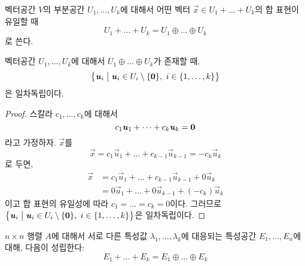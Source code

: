 \documentclass[sections/engineering_mathematics_lecture_note.tex]{subfiles}
\begin{document}
\begin{definition}
    벡터공간 $V$의 부분공간 $U_1, \dots, U_k$에 대해서 어떤 벡터 $\vec x \in U_1 + \dots + U_k$의 합 표현이 유일할 때
    \begin{equation*}
        U_1 + \dots + U_k = U_1 \oplus \dots \oplus U_k
    \end{equation*}
    로 쓴다.
\end{definition}

\begin{theorem} \label{thm:linear_independence_directsum}
    벡터공간 $U_1, \dots, U_k$에 대해서 $U_1 \oplus \dots \oplus U_k$가 존재할 때,
    \begin{equation*}
        \bigl\{\bm{\mathit{u}}_i \bigm| \bm{\mathit{u}}_i \in U_i \setminus \{\bm{\mathrm{0}}\},\ i \in \{1, \dots, k\}\bigr\}
    \end{equation*}
    은 일차독립이다.
\end{theorem}

\begin{proof}
    스칼라 $c_1, \dots, c_k$에 대해서
    \begin{equation*}
        c_1 \bm{\mathit{u}}_1 + \dots + c_k \bm{\mathit{u}}_k = \bm{\mathrm{0}}
    \end{equation*}
    라고 가정하자.
    $\vec x$를
    \begin{equation*}
        \vec x = c_1 \vec u_1 + \dots + c_{k - 1} \vec u_{k - 1} = -c_k \vec u_k
    \end{equation*}
    로 두면,
    \begin{align*}
        \vec x &= c_1 \vec u_1 + \dots + c_{k - 1} \vec u_{k - 1} + 0 \vec u_k\\
               &= 0 \vec u_1 + \dots + 0 \vec u_{k - 1} + (-c_k) \vec u_k
    \end{align*}
    이고 합 표현의 유일성에 따라 $c_1 = \dots = c_k = 0$이다.
    그러므로 $\bigl\{\bm{\mathit{u}}_i \bigm| \bm{\mathit{u}}_i \in U_i \setminus \{\bm{\mathrm{0}}\},\ i \in \{1, \dots, k\}\bigr\}$은 일차독립이다.
\end{proof}

\begin{theorem} \label{thm:eigenspace_directsum}
    $n \times n$ 행렬 $A$에 대해서 서로 다른 특성값 $\lambda_1, \dots, \lambda_k$에 대응되는 특성공간 $E_1, \dots, E_n$에 대해, 다음이 성립한다:
    \begin{equation*}
        E_1 + \dots + E_k = E_1 \oplus \dots \oplus E_k
    \end{equation*}
\end{theorem}
\end{document}
